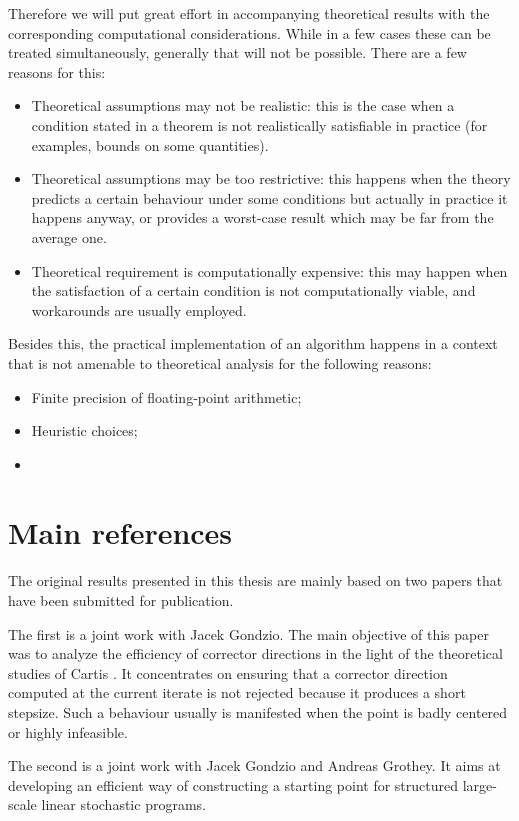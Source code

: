 Therefore we will put great effort in accompanying theoretical
results with the corresponding computational considerations. While
in a few cases these can be treated simultaneously, generally that
will not be possible. There are a few reasons for this:
\begin{itemize}
\item Theoretical assumptions may not be realistic: this is the case
when a condition stated in a theorem is not realistically satisfiable 
in practice (for examples, bounds on some quantities). 
\item Theoretical assumptions may be too restrictive: this happens
when the theory predicts a certain behaviour under some conditions
but actually in practice it happens anyway, or provides a worst-case 
result which may be far from the average one.
\item Theoretical requirement is computationally expensive: this 
may happen when the satisfaction of a certain condition is not 
computationally viable, and workarounds are usually employed.
\end{itemize}

Besides this, the practical implementation of an algorithm happens
in a context that is not amenable to theoretical analysis for the
following reasons:
\begin{itemize}
\item Finite precision of floating-point arithmetic;
\item Heuristic choices;
\item 
\end{itemize}

%
%
\section{Main references}

The original results presented in this thesis are mainly based on two
papers that have been submitted for publication.

The first \cite{ColomboGondzio05} is a joint work with Jacek Gondzio.
The main objective of this paper was to analyze the efficiency of
corrector directions in the light of the theoretical studies of Cartis
\cite{Cartis04,Cartis05}. It concentrates on ensuring that a corrector
direction computed at the current iterate is not rejected because it
produces a short stepsize. Such a behaviour usually is manifested when
the point is badly centered or highly infeasible.

The second \cite{ColomboGondzioGrothey06} is a joint work with
Jacek Gondzio and Andreas Grothey. It aims at developing an
efficient way of constructing a starting point for structured 
large-scale linear stochastic programs.